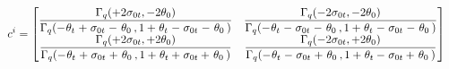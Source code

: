 \documentclass[a4paper,reqno,11pt]{amsart}
\numberwithin{equation}{section}
\numberwithin{figure}{section}
\theoremstyle{plain}
\theoremstyle{remark}
\numberwithin{rhp}{section}
\begin{document}
\begin{align*}
    c^i&=\begin{bmatrix}
        \displaystyle\frac{\Gamma_q(+2\sigma_{0t},-2\theta_0)}{\Gamma_q(-\hspace{0.2mm}\theta_t\hspace{0.2mm}+\hspace{0.2mm}\sigma_{0t}\hspace{0.2mm}-\hspace{0.4mm}\theta_0\hspace{0.7mm},1+\hspace{0.2mm}\theta_t\hspace{0.2mm}-\hspace{0.2mm}\sigma_{0t}\hspace{0.2mm}-\hspace{0.4mm}\theta_0\hspace{0.7mm})} &
        \displaystyle\frac{\Gamma_q(-2\sigma_{0t},-2\theta_0)}{\Gamma_q(-\hspace{0.2mm}\theta_t\hspace{0.2mm}-\hspace{0.2mm}\sigma_{0t}\hspace{0.2mm}-\hspace{0.4mm}\theta_0\hspace{0.7mm},1+\hspace{0.2mm}\theta_t\hspace{0.2mm}-\hspace{0.2mm}\sigma_{0t}\hspace{0.2mm}-\hspace{0.4mm}\theta_0\hspace{0.7mm})}\\
        \displaystyle\frac{\Gamma_q(+2\sigma_{0t},+2\theta_0)}{\Gamma_q(-\hspace{0.2mm}\theta_t\hspace{0.2mm}+\hspace{0.2mm}\sigma_{0t}\hspace{0.2mm}+\hspace{0.4mm}\theta_0\hspace{0.7mm},1+\hspace{0.2mm}\theta_t+\hspace{0.2mm}\sigma_{0t}+\hspace{0.4mm}\theta_0\hspace{0.7mm})} &
        \displaystyle\frac{\Gamma_q(-2\sigma_{0t},+2\theta_0)}{\Gamma_q(-\hspace{0.2mm}\theta_t\hspace{0.2mm}-\hspace{0.2mm}\sigma_{0t}\hspace{0.2mm}+\hspace{0.4mm}\theta_0\hspace{0.7mm},1+\hspace{0.2mm}\theta_t-\hspace{0.2mm}\sigma_{0t}+\hspace{0.4mm}\theta_0\hspace{0.7mm})}

\end{bmatrix}
\end{align*}
\end{document}
